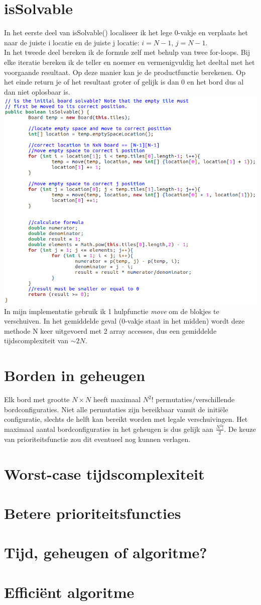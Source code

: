 \documentclass[11pt, a4paper]{article}
\begin{document}
\newpage
\section*{isSolvable}
In het eerste deel van isSolvable() localiseer ik het lege 0-vakje en verplaats het naar de juiste i locatie en de juiste j locatie: $i=N-1$, $j=N-1$.\\
In het tweede deel bereken ik de formule zelf met behulp van twee for-loops. Bij elke iteratie bereken ik de teller en noemer en vermenigvuldig het deeltal met het voorgaande resultaat. Op deze manier kan je de productfunctie berekenen. Op het einde return je of het resultaat groter of gelijk is dan 0 en het bord dus al dan niet oplosbaar is.\\
\includegraphics[width=\textwidth]{isSolvable}\\

In mijn implementatie gebruik ik 1 hulpfunctie \emph{move} om de blokjes te verschuiven. In het gemiddelde geval (0-vakje staat in het midden) wordt deze methode N keer uitgevoerd met 2 array accesses, dus een gemiddelde tijdscomplexiteit van $\sim 2N$.

\section*{Borden in geheugen}
Elk bord met grootte $N \times N$ heeft maximaal $N^2$! permutaties/verschillende bordconfiguraties. Niet alle permutaties zijn bereikbaar vanuit de initi\"ele configuratie, slechts de helft kan bereikt worden met legale verschuivingen. Het maximaal aantal bordconfiguraties in het geheugen is dus gelijk aan $\frac{N^2!}{2}$. De keuze van prioriteitsfunctie zou dit eventueel nog kunnen verlagen.
	
\section*{Worst-case tijdscomplexiteit}
\section*{Betere prioriteitsfuncties}
\section*{Tijd, geheugen of algoritme?}
\section*{Effici\"ent algoritme}
\end{document}
